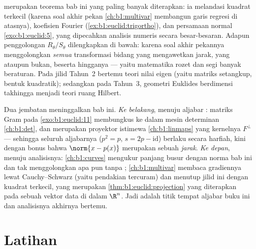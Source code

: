 \begin{remark}
\label{rem:b1:euclid:whereused}
 merupakan teorema bab ini yang paling banyak diterapkan:
ia melandasi kuadrat terkecil (karena soal akhir pekan
\cref{ch:b1:multivar} membangun garis regresi di atasnya), koefisien
Fourier (\cref{ex:b1:euclid:trigortho}), dan persamaan
normal \cref{exo:b1:euclid:5}, yang dipecahkan analisis numeris
secara besar-besaran. Adapun penggolongan $R_\theta / S_\theta$
dilengkapkan di bawah: karena soal akhir pekannya menggolongkan \emph{semua}
transformasi bidang yang mengawetkan jarak, yang  ataupun bukan,
beserta  hingganya --- yaitu matematika rozet dan
segi banyak beraturan. Pada jilid Tahun~2  bertemu
teori nilai eigen (yaitu matriks setangkup, bentuk kuadratik); sedangkan pada
Tahun~3, geometri Euklides berdimensi takhingga menjadi teori ruang
Hilbert.
\end{remark}

\begin{remark}
\label{rem:b1:euclid:perspectives}
Dua jembatan meninggalkan bab ini. \emph{Ke belakang}, menuju aljabar
: matriks Gram pada \cref{exo:b1:euclid:11} membungkus
 ke dalam mesin determinan
\cref{ch:b1:det}, dan  merupakan
proyektor istimewa \cref{ch:b1:linmaps} yang kernelnya
$F^\perp$ --- sehingga seluruh aljabarnya ($p^2 = p$, $s = 2p -
\mathrm{id}$) berlaku secara harfiah, kini dengan bonus bahwa $\norm{x
- p(x)}$ merupakan sebuah \emph{jarak}. \emph{Ke depan}, menuju analisisnya:
\cref{ch:b1:curves} mengukur panjang busur dengan norma bab ini
dan tak menggolongkan apa pun tanpa ;
\cref{ch:b1:multivar} membaca gradiennya lewat
Cauchy--Schwarz (yaitu pendakian tercuram) dan menutup jilid ini dengan
kuadrat terkecil, yang merupakan \cref{thm:b1:euclid:projection} yang diterapkan
pada sebuah vektor data di dalam $\R^n$. Jadi  adalah titik
tempat aljabar buku ini dan analisisnya akhirnya bertemu.
\end{remark}

\section{Latihan}

